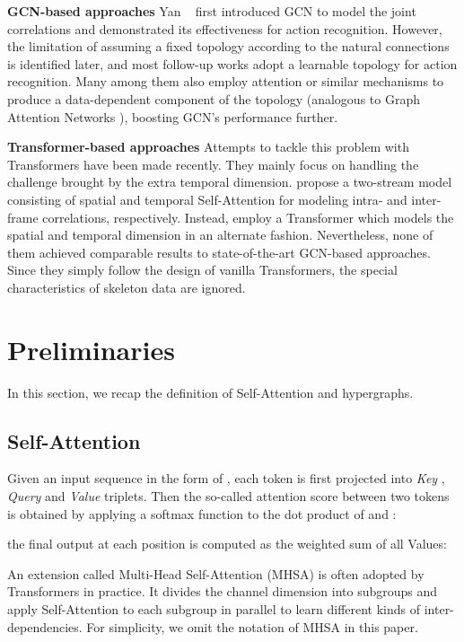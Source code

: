 \documentclass[10pt,twocolumn,letterpaper]{article}
\begin{document}
\textbf{GCN-based approaches}  Yan \etal~\cite{yan2018spatial} first introduced GCN \cite{kipf2016semi} to model the joint correlations and demonstrated its effectiveness for action recognition. However, 
the limitation of assuming a fixed topology according to the natural connections is identified later, and most follow-up works adopt a learnable topology for action recognition.
Many among them \cite{cheng2020decoupling, shi2019two, chen2021channel, ye2020dynamic} also employ attention or similar mechanisms to produce a data-dependent component of the  
topology (analogous to Graph Attention Networks \cite{velivckovic2017graph}), boosting GCN's performance further.

\textbf{Transformer-based approaches}
Attempts to tackle this problem with Transformers have been made recently.
They mainly focus on handling the challenge brought by the extra temporal dimension. 
\cite{plizzari2021spatial} propose a two-stream model consisting of spatial and temporal Self-Attention for modeling intra- and inter-frame correlations, respectively. Instead, \cite{shi2020decoupled} employ a Transformer which models the spatial and temporal dimension in an alternate fashion. 
Nevertheless, none of them achieved comparable results to state-of-the-art GCN-based approaches. Since they simply follow the design of vanilla Transformers, the special characteristics of skeleton data are ignored.

\section{Preliminaries}
In this section, we recap the definition of Self-Attention and hypergraphs.

\subsection{Self-Attention}






Given an input sequence in the form of , each token  is first projected into \textit{Key}  , \textit{Query}   and \textit{Value}   triplets.
Then the so-called attention score  between two tokens is obtained by applying a softmax function to the dot product of  and  \cite{vaswani2017attention}:

the final output at each position is computed as the weighted sum of all Values:

An extension called Multi-Head Self-Attention (MHSA) is often adopted by Transformers in practice. It
divides the channel dimension into subgroups and apply Self-Attention to each subgroup in parallel to learn different kinds of inter-dependencies. For simplicity, we omit the notation of MHSA in this paper.
\end{document}
